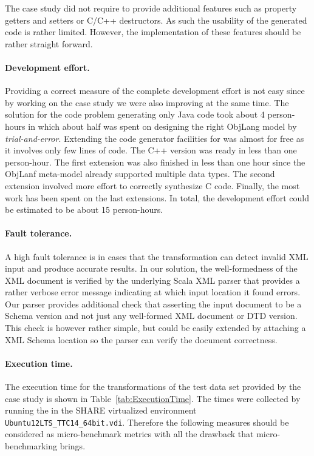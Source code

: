 The case study did not require to provide additional features such as property getters and setters or C/C++ destructors.
As such the usability of the generated code is rather limited.
However, the implementation of these features should be rather straight forward.

\paragraph{Development effort.}

Providing a correct measure of the complete development effort is not easy since by working on the case study we were also improving \SIGMA at the same time.
The solution for the code problem generating only Java code took about 4 person-hours in which about half was spent on designing the right ObjLang model by \emph{trial-and-error}.
Extending the code generator facilities for \Csharp was almost for free as it involves only few lines of code.
The C++ version was ready in less than one person-hour.
The first extension was also finished in less than one hour since the ObjLanf meta-model already supported multiple data types.
The second extension involved more effort to correctly synthesize C code.
Finally, the most work has been spent on the last extensions.
In total, the development effort could be estimated to be about 15 person-hours.

\paragraph{Fault tolerance.}
%
A high fault tolerance is in cases that the transformation can detect invalid XML input and produce accurate results.
In our solution, the well-formedness of the XML document is verified by the underlying Scala XML parser that provides a rather verbose error message indicating at which input location it found errors.
Our parser provides additional check that asserting the input document to be a  Schema version and not just any well-formed XML document or \FXIML DTD version.
This check is however rather simple, but could be easily extended by attaching a \FIXML XML Schema location so the parser can verify the document correctness.

\paragraph{Execution time.}

The execution time for the transformations of the test data set provided by the case study is shown in Table~\ref{tab:ExecutionTime}.
The times were collected by running the in the SHARE virtualized environment \texttt{Ubuntu12LTS\_TTC14\_64bit\SIGMA.vdi}.
Therefore the following measures should be considered as micro-benchmark metrics with all the drawback that micro-benchmarking brings.

